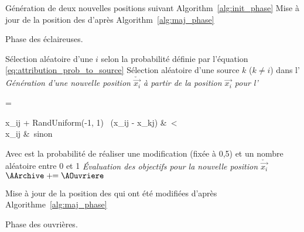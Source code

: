 \begin{algorithm}\label{alg:scout_phase}
  \SetAlgoVlined
  \DontPrintSemicolon
  {
    {
      Génération de deux nouvelles positions suivant Algorithm~\ref{alg:init_phase}\;
    }
  }
  Mise à jour de la position des \ASources d’après Algorithm~\ref{alg:maj_phase}\;
  \caption{Phase des éclaireuses.}
\end{algorithm}


\begin{algorithm}\label{alg:onlooker_phase}
  \SetAlgoVlined
  \DontPrintSemicolon
  \For{$\AOuvriere \in \AOnlookers$}
    {
      Sélection aléatoire d’une \ASource $i$ selon la probabilité
      définie par l’équation \eqref{eq:attribution_prob_to_source}\;
      Sélection aléatoire d’une source $k$ ($k \neq i$) dans l’\AArchive\;
       \emph{Génération d’une nouvelle position $\check{\vec{x_{i}}}$ à partir de la
                         position $\vec{x_{i}}$ pour l’\AOuvriere }\;
      {
      \begin{algomathdisplay}
         =%
          \begin{cases}
            x_{ij}  + RandUniform(-1, 1)   \times \ (x_{ij} - x_{kj}) &\ \ATirageB < \AMR \\
            x_{ij}                                                    &\ sinon
          \end{cases}
      \end{algomathdisplay}
      }
      \BlankLine
      Avec \AMR est la probabilité de réaliser une modification (fixée à 0,5) et
      \ATirageB un nombre aléatoire entre 0 et 1\;
      \BlankLine
       \emph{Évaluation des objectifs pour la nouvelle position $\check{\vec{x_{i}}}$}\;
      \BlankLine
      {
        $\AArchive \pluseq \AOuvriere$ 
      }
    }

  Mise à jour de la position des \ASources qui ont été modifiées d’après Algorithme~\ref{alg:maj_phase}\;
  \caption{Phase des ouvrières.}
\end{algorithm}

